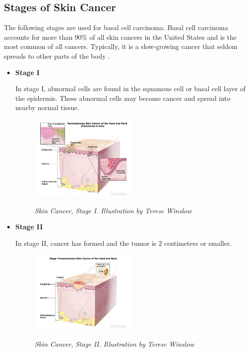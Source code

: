 \subsection{Stages of Skin Cancer}

The following stages are used for basal cell carcinoma. Basal cell carcinoma
accounts for more than 90\% of all skin cancers in the United States and is the
most common of all cancers. Typically, it is a slow-growing cancer that seldom
spreads to other parts of the body \cite{CancerInstitute}. \newline

\begin{itemize}

  \item \textbf{Stage I}

    In stage I, abnormal cells are found in the squamous cell or basal cell
    layer of the epidermis. These abnormal cells may become cancer and spread
    into nearby normal tissue.

    \begin{figure}[H] \centering
      \includegraphics[width=0.5\textwidth]{imatges/problem_domain/phase0-skin-cancer.jpg}
      \caption[Skin Cancer, Stage I]{\textit{Skin Cancer, Stage I. Illustration by Terese Winslow}}
    {\label{fig:stage0-skin-canceer}} \end{figure}


  \item \textbf{Stage II}

    In stage II, cancer has formed and the tumor is 2 centimeters or smaller.

    \begin{figure}[H] \centering
      \includegraphics[width=0.5\textwidth]{imatges/problem_domain/stage1-skin-cancer.jpg}
      \caption[Skin Cancer, Stage II]{\textit{Skin Cancer, Stage II.
      Illustration by Terese Winslow}} {\label{fig:stage1-skin-canceer}}
    \end{figure}



\end{itemize}
